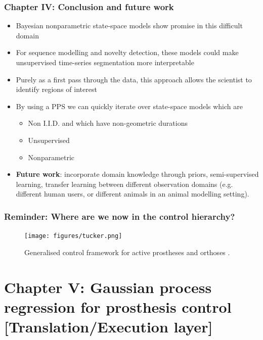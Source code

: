 \documentclass[aspectratio=169]{beamer}
\begin{document}
\begin{frame}
    \frametitle{Chapter IV: Conclusion and future work}
    \begin{itemize}
        \item Bayesian nonparametric state-space models show promise in this difficult domain 
        \item For sequence modelling and novelty detection, these models could make unsupervised time-series
            segmentation more interpretable 
        \item Purely as a first pass through the data, this approach allows the scientist to identify regions of interest
        \item By using a PPS we can quickly iterate over state-space models which are 
            \begin{itemize}
                \item Non I.I.D.  and which have non-geometric durations
                \item Unsupervised
                \item Nonparametric
            \end{itemize}
        \item {\bf Future work}: incorporate domain knowledge through priors, semi-supervised learning, transfer
            learning between different observation domains (e.g. different human users, or different animals in an
            animal modelling setting). 
    \end{itemize}
\end{frame}


\begin{frame}[plain]
    \frametitle{Reminder: Where are we now in the control hierarchy?}
    \begin{figure}
        \centering
        \texttt{[image: figures/tucker.png]}
        \caption{Generalised control framework for active prostheses and orthoses \citep{tucker2015control}.}
    \end{figure}
\end{frame}


\section{Chapter V: Gaussian process regression for prosthesis control [Translation/Execution layer]} 
\end{document}
